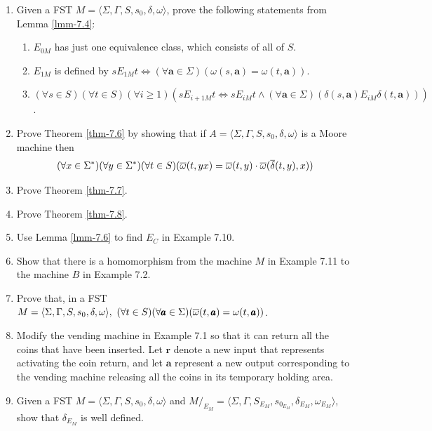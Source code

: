\begin{enumerate}[{7.}1.]
\item Given a FST $M=\langle\Sigma,\Gamma,S,s_0,\delta,\omega\rangle$, prove the
following statements from Lemma \ref{lmm-7.4}:
\begin{enumerate}
\item $E_{0M}$ has just one equivalence class, which consists of all of $S$.
\item $E_{1M}$ is defined by $s E_{1M} t \Leftrightarrow (\forall \pmb{a} \in \Sigma)
	(\omega(s,\pmb{a}) = \omega(t,\pmb{a}))$.
\item $(\forall s \in S)(\forall t \in S)(\forall i \geq 1)(s E_{i+1M} t
	\Leftrightarrow s E_{iM} t \wedge (\forall\pmb{a}\in\Sigma)
	(\delta(s,\pmb{a}) E_{iM} \delta(t,\pmb{a})))$.
\end{enumerate}

\item Prove Theorem \ref{thm-7.6} by showing that if $A=\langle\Sigma,\Gamma,S,s_0,\delta,
\omega\rangle$ is a Moore machine then \[(\forall x \in \Sigma^*)(\forall y \in
\Sigma^*)(\forall t \in S)(\overline{\omega}(t,yx) = \overline{\omega}(t,y) \cdot \overline{\omega}(\overline{\delta}(t,y),x))\]

\item Prove Theorem \ref{thm-7.7}.

\item Prove Theorem \ref{thm-7.8}.

\item Use Lemma \ref{lmm-7.6} to find $E_C$ in Example 7.10.

\item Show that there is a homomorphism from the machine $M$ in Example 7.11 to
the machine $B$ in Example 7.2.

\item Prove that, in a FST $M=\langle\Sigma,\Gamma,S,s_0,\delta,\omega\rangle,\
(\forall t \in S)(\forall\pmb{a}\in\Sigma)(\overline{\omega}(t,\pmb{a})=\omega(t,\pmb{a}))$.

\item Modify the vending machine in Example 7.1 so that it can return all the
coins that have been inserted. Let $\pmb{r}$ denote a new input that represents
activating the coin return, and let $\pmb{a}$ represent a new output corresponding
to the vending machine releasing all the coins in its temporary holding area.

\item Given a FST $M=\langle\Sigma,\Gamma,S,s_0,\delta,\omega\rangle$ and
$M/  _{E_M}=\langle\Sigma,\Gamma,S_{E_M},s_{0_{E_M}},\delta_{E_M},\omega_{E_M}
\rangle$, show that $\delta_{E_M}$ is well defined.


\end{enumerate}
